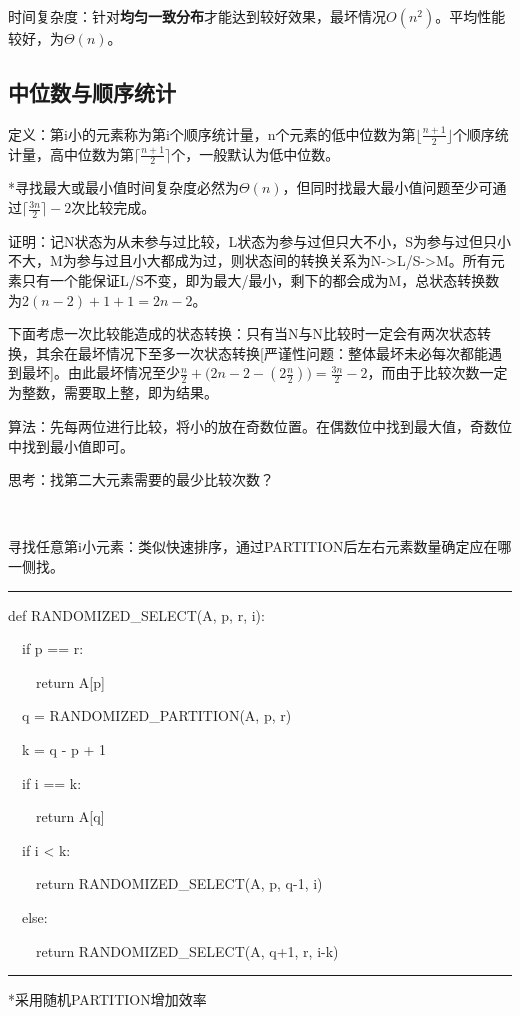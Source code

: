 \documentclass[a4paper,UTF8,fontset=windows]{ctexart}
\newenvironment{code}{\rule{36em}{0.1em}\setlength{\parindent}{1em}

}{

\setlength{\parindent}{0em}\rule{36em}{0.1em}}
\begin{document}
时间复杂度：针对\textbf{均匀一致分布}才能达到较好效果，最坏情况$O(n^2)$。平均性能较好，为$\Theta(n)$。

\subsection{中位数与顺序统计}
定义：第i小的元素称为第i个顺序统计量，n个元素的低中位数为第$\lfloor\frac{n+1}{2}\rfloor$个顺序统计量，高中位数为第$\lceil\frac{n+1}{2}\rceil$个，一般默认为低中位数。

*\hspace{0em}寻找最大或最小值时间复杂度必然为$\Theta(n)$，但同时找最大最小值问题至少可通过$\lceil\frac{3n}{2}\rceil-2$次比较完成。

证明：记N状态为从未参与过比较，L状态为参与过但只大不小，S为参与过但只小不大，M为参与过且小大都成为过，则状态间的转换关系为N->L/S->M。所有元素只有一个能保证L/S不变，即为最大/最小，剩下的都会成为M，总状态转换数为$2(n-2)+1+1=2n-2$。

下面考虑一次比较能造成的状态转换：只有当N与N比较时一定会有两次状态转换，其余在最坏情况下至多一次状态转换[严谨性问题：整体最坏未必每次都能遇到最坏]。由此最坏情况至少$\frac{n}{2}+\big(2n-2-(2\frac{n}{2})\big)=\frac{3n}{2}-2$，而由于比较次数一定为整数，需要取上整，即为结果。

算法：先每两位进行比较，将小的放在奇数位置。在偶数位中找到最大值，奇数位中找到最小值即可。

思考：找第二大元素需要的最少比较次数？

\

寻找任意第i小元素：类似快速排序，通过PARTITION后左右元素数量确定应在哪一侧找。

\begin{code}
def RANDOMIZED\_SELECT(A, p, r, i):

\ \ if p == r:

\ \ \ \ return A[p]

\ \ q = RANDOMIZED\_PARTITION(A, p, r)

\ \ k = q - p + 1

\ \ if i == k:

\ \ \ \ return A[q]

\ \ if i < k:

\ \ \ \ return RANDOMIZED\_SELECT(A, p, q-1, i)

\ \ else:

\ \ \ \ return RANDOMIZED\_SELECT(A, q+1, r, i-k)
\end{code}

*\hspace{0em}采用随机PARTITION增加效率
\end{document}
